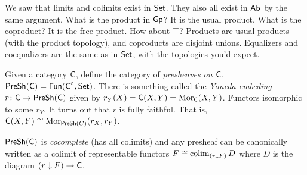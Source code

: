 We saw that limits and colimits exist in $\operatorname{\sf Set}$. They also all exist in $\text{\sf Ab}$ by the same argument. What is the product in $\text{\sf Gp}$? It is the usual product. What is the coproduct? It is the free product. How about $\top$? Products are usual products (with the product topology), and coproducts are disjoint unions. Equalizers and coequalizers are the same as in $\operatorname{\sf Set}$, with the topologies you'd expect.

Given a category $\text{\sf C}$, define the category of \emph{presheaves on $\text{\sf C}$}, $\operatorname{\sf PreSh}(\text{\sf C})=\text{\sf Fun}(\text{\sf C}^\circ, \operatorname{\sf Set})$. There is something called the \emph{Yoneda embeding} $r\colon \text{\sf C}\to \operatorname{\sf PreSh}(\text{\sf C})$ given by $r_Y(X)=\text{\sf C}(X,Y)=\operatorname{Mor}_{\text{\sf C}}(X,Y)$. Functors isomorphic to some $r_Y$. It turns out that $r$ is fully faithful. That is, $\text{\sf C}(X,Y)\cong \operatorname{Mor}_{\operatorname{\sf PreSh}(C)}(r_X,r_Y)$.
\begin{theorem}
 $\operatorname{\sf PreSh}(\text{\sf C})$ is \emph{cocomplete} (has all colimits) and any presheaf can be canonically written as a colimit of representable functors $F\cong \operatorname{colim}_{(r\downarrow F)} D$ where $D$ is the diagram $(r\downarrow F)\to \text{\sf C}$.
\end{theorem}

